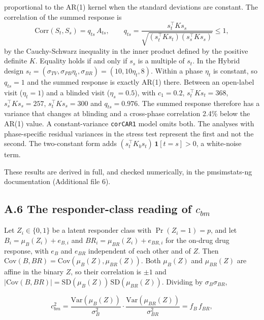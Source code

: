 \documentclass[
  11pt,
]{article}
\begin{document}
proportional to the AR(1) kernel when the standard deviations are
constant. The correlation of the summed response is
\[\mathrm{Corr}(S_t, S_s) = q_{ts}\,A_{ts}, \qquad
q_{ts} = \frac{s_t^\top K s_s}
  {\sqrt{(s_t^\top K s_t)(s_s^\top K s_s)}} \le 1,\]
by the Cauchy-Schwarz inequality in the inner product defined by the
positive definite \(K\). Equality holds if and only if \(s_s\) is a
multiple of \(s_t\). In the Hybrid design
\(s_t = (\sigma_{TV}, \sigma_{PB}\eta_t, \sigma_{BR}) = (10, 10\eta_t, 8)\).
Within a phase \(\eta_t\) is constant, so \(q_{ts} = 1\) and the
summed response is exactly AR(1) there. Between an open-label visit
(\(\eta_t = 1\)) and a blinded visit (\(\eta_s = 0.5\)), with \(c_1 = 0.2\),
\(s_t^\top K s_t = 368\), \(s_s^\top K s_s = 257\), \(s_t^\top K s_s = 300\)
and \(q_{ts} = 0.976\). The summed response therefore has a
variance that changes at blinding and a cross-phase correlation 2.4\%
below the AR(1) value. A constant-variance \texttt{corCAR1} model omits both.
The analyses with phase-specific residual variances in the stress test
represent the first and not the second. The two-constant form adds
\((s_t^\top K_b s_t)\,\mathbf 1[t = s] > 0\), a white-noise term.

These results are derived in full, and checked numerically, in the
pmsimstats-ng documentation (Additional file 6).

\subsection*{\texorpdfstring{A.6 The responder-class reading of \(c_{bm}\)}{A.6 The responder-class reading of c\_\{bm\}}}\label{a.6-the-responder-class-reading-of-c_bm}

Let \(Z_i \in \{0, 1\}\) be a latent responder class with
\(\Pr(Z_i = 1) = p\), and let \(B_i = \mu_B(Z_i) + e_{B,i}\) and
\(BR_i = \mu_{BR}(Z_i) + e_{BR,i}\) for the on-drug drug response, with
\(e_B\) and \(e_{BR}\) independent of each other and of \(Z\). Then
\(\mathrm{Cov}(B, BR) = \mathrm{Cov}(\mu_B(Z), \mu_{BR}(Z))\). Both
\(\mu_B(Z)\) and \(\mu_{BR}(Z)\) are affine in the binary \(Z\), so their
correlation is \(\pm 1\) and
\(\lvert\mathrm{Cov}(B, BR)\rvert = \mathrm{SD}(\mu_B(Z))\,\mathrm{SD}(\mu_{BR}(Z))\).
Dividing by \(\sigma_B\sigma_{BR}\),

\[c_{bm}^2 = \frac{\mathrm{Var}(\mu_B(Z))}{\sigma_B^2}\cdot
  \frac{\mathrm{Var}(\mu_{BR}(Z))}{\sigma_{BR}^2} = f_B\, f_{BR},\]
\end{document}
